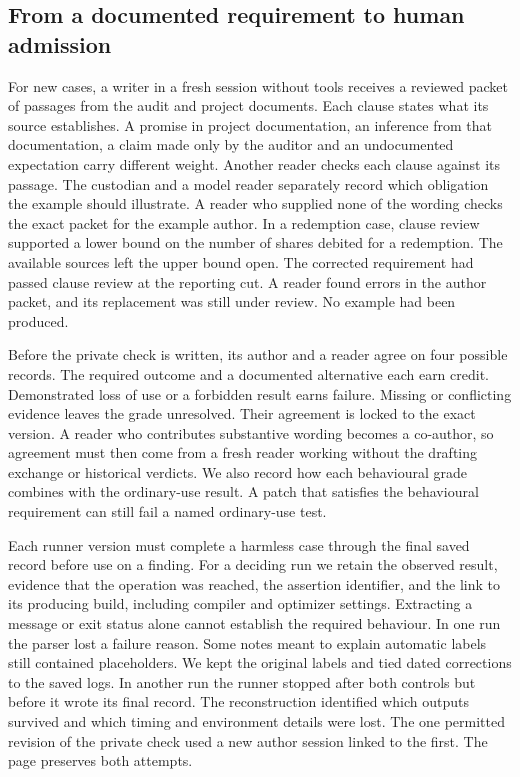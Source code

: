 \subsection{From a documented requirement to human admission}

For new cases, a writer in a fresh session without tools receives a reviewed packet of passages from the audit and project documents. Each clause states what its source establishes. A promise in project documentation, an inference from that documentation, a claim made only by the auditor and an undocumented expectation carry different weight. Another reader checks each clause against its passage. The custodian and a model reader separately record which obligation the example should illustrate. A reader who supplied none of the wording checks the exact packet for the example author. In a redemption case, clause review supported a lower bound on the number of shares debited for a redemption. The available sources left the upper bound open. The corrected requirement had passed clause review at the reporting cut. A reader found errors in the author packet, and its replacement was still under review. No example had been produced.

Before the private check is written, its author and a reader agree on four possible records. The required outcome and a documented alternative each earn credit. Demonstrated loss of use or a forbidden result earns failure. Missing or conflicting evidence leaves the grade unresolved. Their agreement is locked to the exact version. A reader who contributes substantive wording becomes a co-author, so agreement must then come from a fresh reader working without the drafting exchange or historical verdicts. We also record how each behavioural grade combines with the ordinary-use result. A patch that satisfies the behavioural requirement can still fail a named ordinary-use test.

Each runner version must complete a harmless case through the final saved record before use on a finding. For a deciding run we retain the observed result, evidence that the operation was reached, the assertion identifier, and the link to its producing build, including compiler and optimizer settings. Extracting a message or exit status alone cannot establish the required behaviour. In one run the parser lost a failure reason. Some notes meant to explain automatic labels still contained placeholders. We kept the original labels and tied dated corrections to the saved logs. In another run the runner stopped after both controls but before it wrote its final record. The reconstruction identified which outputs survived and which timing and environment details were lost. The one permitted revision of the private check used a new author session linked to the first. The page preserves both attempts.

